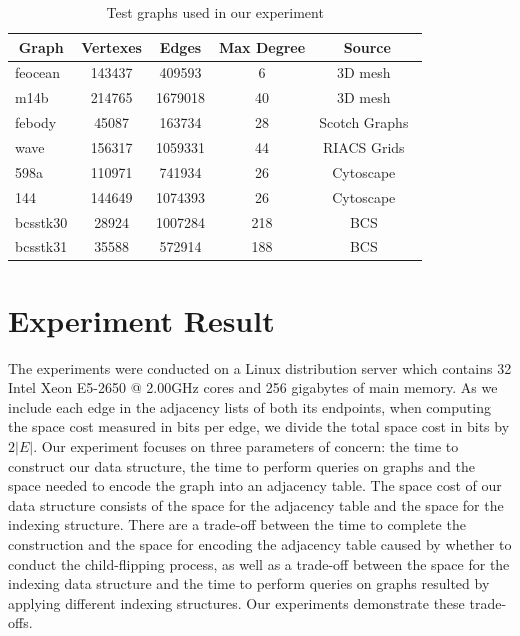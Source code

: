 \documentclass[12pt,glossary]{dalthesis}
\begin{document}
\begin{table}[ht]
\centering
\caption{ Test graphs used in our experiment }
\label{graph-list}
\begin{tabular}{|l||c|c|c|c|}
\hline
\multicolumn{1}{|c||}{Graph} & Vertexes & Edges   & Max Degree & Source        \\ \hline
feocean                   & 143437   & 409593  & 6          & 3D mesh~\cite{3DMESH}        \\
m14b                      & 214765   & 1679018 & 40         & 3D mesh~\cite{3DMESH}       \\
febody                    & 45087    & 163734  & 28         & Scotch Graphs~\cite{Scotch} \\ 
wave                      & 156317   & 1059331 & 44         & RIACS Grids~\cite{RIACS}    \\
598a                      & 110971   & 741934  & 26         & Cytoscape~\cite{Cytoscape}      \\
144                       & 144649   & 1074393 & 26         & Cytoscape~\cite{Cytoscape}     \\
bcsstk30                  & 28924    & 1007284 & 218        & BCS~\cite{Matrix}    \\
bcsstk31                  & 35588    & 572914  & 188        & BCS~\cite{Matrix}     \\ \hline
\end{tabular}
\end{table}


\section{Experiment Result} 
The experiments were conducted on a Linux distribution server which contains 32 Intel Xeon E5-2650 @ 2.00GHz cores and 256 gigabytes of main memory. As we include each edge in the adjacency lists of both its endpoints, when computing the space cost measured in bits per edge, we divide the total space cost in bits by $2|E|$. Our experiment focuses on three parameters of concern: the time to construct our data structure, the time to perform queries on graphs and the space needed to encode the graph into an adjacency table. The space cost of our data structure consists of the space for the adjacency table and the space for the indexing structure. There are a trade-off between the time to complete the construction and the space for encoding the adjacency table caused by whether to conduct the child-flipping process, as well as a trade-off between the space for the indexing data structure and the time to perform queries on graphs resulted by applying different indexing structures. Our experiments demonstrate these trade-offs.
\end{document}
